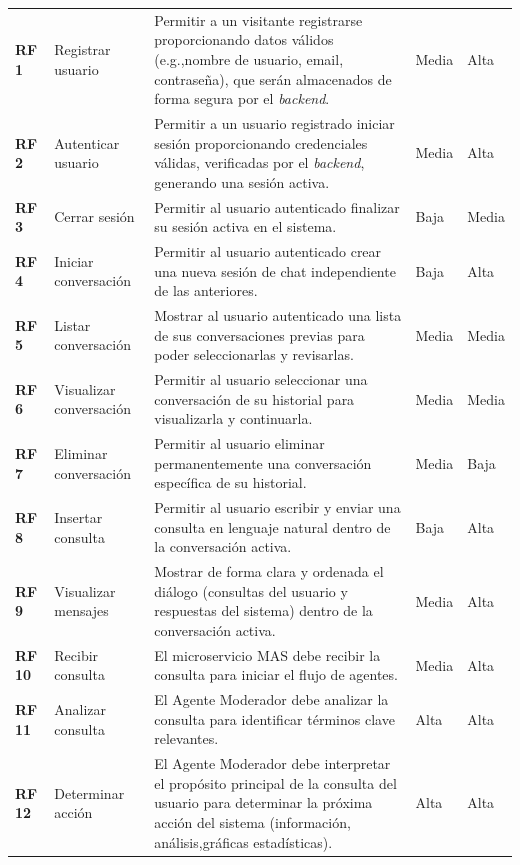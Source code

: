 \begin{longtable}{@{}l >{\raggedright\arraybackslash}p{4.5cm} >{\raggedright\arraybackslash}p{6.5cm} l l@{}}
	\textbf{RF 1} & Registrar usuario & Permitir a un visitante registrarse proporcionando datos válidos (e.g.,nombre de usuario, email, contraseña), que serán almacenados de forma segura por el \textit{backend}. & Media & Alta \\ 
	\textbf{RF 2} & Autenticar usuario & Permitir a un usuario registrado iniciar sesión proporcionando credenciales válidas, verificadas por el \textit{backend}, generando una sesión activa. & Media & Alta \\ 
	\textbf{RF 3} & Cerrar sesión & Permitir al usuario autenticado finalizar su sesión activa en el sistema. & Baja & Media \\ 
	\textbf{RF 4} & Iniciar conversación & Permitir al usuario autenticado crear una nueva sesión de chat independiente de las anteriores. & Baja & Alta \\ %
	\textbf{RF 5} & Listar conversación & Mostrar al usuario autenticado una lista de sus conversaciones previas para poder seleccionarlas y revisarlas. & Media & Media \\ %
	\textbf{RF 6} & Visualizar conversación & Permitir al usuario seleccionar una conversación de su historial para visualizarla y continuarla. & Media & Media \\ %
	\textbf{RF 7} & Eliminar conversación & Permitir al usuario eliminar permanentemente una conversación específica de su historial. & Media & Baja \\ 
	\textbf{RF 8} & Insertar consulta & Permitir al usuario escribir y enviar una consulta en lenguaje natural dentro de la conversación activa. & Baja & Alta \\ 
	\textbf{RF 9} & Visualizar mensajes & Mostrar de forma clara y ordenada el diálogo (consultas del usuario y respuestas del sistema) dentro de la conversación activa. & Media & Alta \\  
	\textbf{RF 10} & Recibir consulta & El microservicio MAS debe recibir la consulta para iniciar el flujo de agentes. & Media & Alta \\ 
	\textbf{RF 11} & Analizar consulta & El Agente Moderador debe analizar la consulta para identificar términos clave relevantes. & Alta & Alta \\ 
	\textbf{RF 12} & Determinar acción & El Agente Moderador debe interpretar el propósito principal de la consulta del usuario para determinar la próxima acción del sistema (información, análisis,gráficas estadísticas). & Alta & Alta \\ 

\end{longtable}
